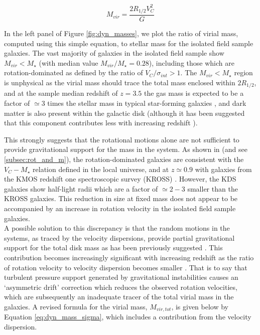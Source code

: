 \documentclass[fleqn,usenatbib]{mnras}
\begin{document}
\begin{equation}\label{eq:dyn_mass_kds}
   M_{vir} = \frac{2R_{1/2}V_{C}^{2}}{G}
\end{equation}

\noindent
In the left panel of Figure \ref{fig:dyn_masses}, we plot the ratio of virial mass, computed using this simple equation, to stellar mass for the isolated field sample galaxies.
The vast majority of galaxies in the isolated field sample show $M_{vir} < M_{\star}$ (with median value $M_{vir}/M_{\star}=0.28$), including those which are rotation-dominated as defined by the ratio of $V_{C}/\sigma_{int} > 1$.
The $M_{vir} < M_{\star}$ region is unphysical as the virial mass should trace the total mass enclosed within $2R_{1/2}$, and at the sample median redshift of $z=3.5$ the gas mass is expected to be a factor of $\simeq3$ times the stellar mass in typical star-forming galaxies \citep{Tacconi2013,Tacconi2017}, and dark matter is also present within the galactic disk (although it has been suggested that this component contributes less with increasing redshift \citealt{Ubler2017,Genzel2017,Lang2017}).

This strongly suggests that the rotational motions alone are not sufficient to provide gravitational support for the mass in the system.
As shown in \cite{Turner2017} (and see \cref{subsec:rot_and_m}), the rotation-dominated galaxies are consistent with the $V_{C}-M_{\star}$ relation defined in the local universe, and at $z\simeq0.9$ with galaxies from the KMOS redshift one spectroscopic survey (KROSS) \citep{Harrison2017}.
However, the KDS galaxies show half-light radii which are a factor of $\simeq2-3$ smaller than the KROSS galaxies.
This reduction in size at fixed mass does not appear to be accompanied by an increase in rotation velocity in the isolated field sample galaxies. \\

\noindent
A possible solution to this discrepancy is that the random motions in the systems, as traced by the velocity dispersions, provide partial gravitational support for the total disk mass as has been previously suggested \citep[e.g.][]{Burkert2010,Newman2013,Ubler2017}.
This contribution becomes increasingly significant with increasing redshift as the ratio of rotation velocity to velocity dispersion becomes smaller \citep[e.g.][]{ForsterSchreiber2009,Law2009,Epinat2012,Stott2016,Turner2017}.
That is to say that turbulent pressure support generated by gravitational instabilities causes an `asymmetric drift' correction \citep[e.g.][]{Burkert2010} which reduces the observed rotation velocities, which are subsequently an inadequate tracer of the total virial mass in the galaxies.
A revised formula for the virial mass, $M_{vir,tot}$, is given below by Equation \ref{eq:dyn_mass_sigma}, which includes a contribution from the velocity dispersion.
\end{document}
